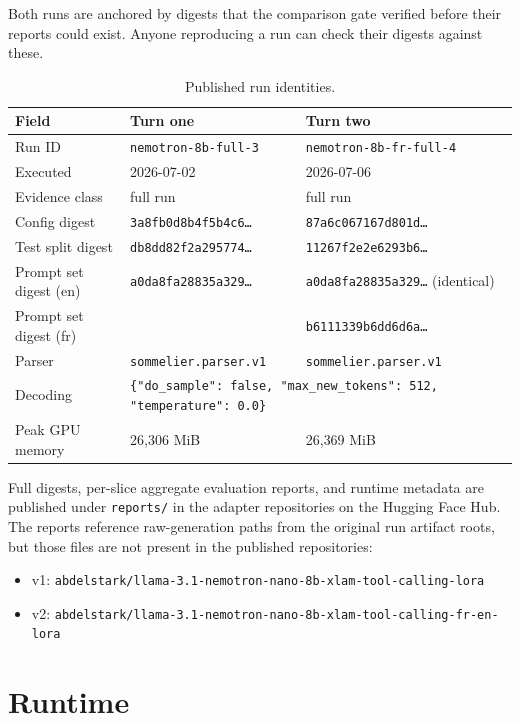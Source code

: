 \documentclass{article}
\begin{document}
Both runs are anchored by digests that the comparison gate verified before their reports could exist. Anyone reproducing a run can check their digests against these.

\begin{table}[h]
  \caption{Published run identities.}
  \label{tab:identity}
  \centering
  \scriptsize
  \begin{tabular}{lll}
    \toprule
    Field & Turn one & Turn two \\
    \midrule
    Run ID & \texttt{nemotron-8b-full-3} & \texttt{nemotron-8b-fr-full-4} \\
    Executed & 2026-07-02 & 2026-07-06 \\
    Evidence class & full run & full run \\
    Config digest & \texttt{3a8fb0d8b4f5b4c6\ldots} & \texttt{87a6c067167d801d\ldots} \\
    Test split digest & \texttt{db8dd82f2a295774\ldots} & \texttt{11267f2e2e6293b6\ldots} \\
    Prompt set digest (en) & \texttt{a0da8fa28835a329\ldots} & \texttt{a0da8fa28835a329\ldots} (identical) \\
    Prompt set digest (fr) & & \texttt{b6111339b6dd6d6a\ldots} \\
    Parser & \texttt{sommelier.parser.v1} & \texttt{sommelier.parser.v1} \\
    Decoding & \multicolumn{2}{l}{\texttt{\{"do\_sample": false, "max\_new\_tokens": 512, "temperature": 0.0\}}} \\
    Peak GPU memory & 26{,}306 MiB & 26{,}369 MiB \\
    \bottomrule
  \end{tabular}
\end{table}

Full digests, per-slice aggregate evaluation reports, and runtime metadata are published under \texttt{reports/} in the adapter repositories on the Hugging Face Hub. The reports reference raw-generation paths from the original run artifact roots, but those files are not present in the published repositories:
\begin{itemize}
  \item v1: \texttt{abdelstark/llama-3.1-nemotron-nano-8b-xlam-tool-calling-lora}
  \item v2: \texttt{abdelstark/llama-3.1-nemotron-nano-8b-xlam-tool-calling-fr-en-lora}
\end{itemize}

\section{Runtime}
\label{app:runtime}
\end{document}
